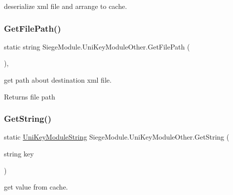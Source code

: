 deserialize xml file and arrange to cache. 

\mbox{\label{class_siege_module_1_1_uni_key_module_other_a5fd17dc4ef93fddb66a5d47d48fd5e0c}} 
\subsubsection{\texorpdfstring{Get\+File\+Path()}{GetFilePath()}}
{\footnotesize\ttfamily static string Siege\+Module.\+Uni\+Key\+Module\+Other.\+Get\+File\+Path (\begin{DoxyParamCaption}{ }\end{DoxyParamCaption})\hspace{0.3cm}{\ttfamily [static]}, {\ttfamily [private]}}



get path about destination xml file. 

\begin{DoxyReturn}{Returns}
file path
\end{DoxyReturn}
\mbox{\label{class_siege_module_1_1_uni_key_module_other_af31fe254c5de6ef3f85001865801d0af}} 
\subsubsection{\texorpdfstring{Get\+String()}{GetString()}}
{\footnotesize\ttfamily static \mbox{\hyperlink{struct_siege_module_1_1_uni_key_module_string}{Uni\+Key\+Module\+String}} Siege\+Module.\+Uni\+Key\+Module\+Other.\+Get\+String (\begin{DoxyParamCaption}\item[{string}]{key }\end{DoxyParamCaption})\hspace{0.3cm}{\ttfamily [static]}}



get value from cache. 

